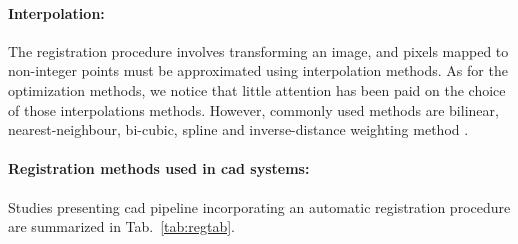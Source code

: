 \paragraph{Interpolation:} 
The registration procedure involves transforming an image, and pixels mapped to non-integer points must be approximated using interpolation methods.
As for the optimization methods, we notice that little attention has been paid on the choice of those interpolations methods.
However, commonly used methods are bilinear, nearest-neighbour, bi-cubic, spline and inverse-distance weighting method \cite{Mitra2012}.

\paragraph{Registration methods used in \ac{cad} systems:}
Studies presenting \ac{cad} pipeline incorporating an automatic registration procedure are summarized in Tab.~\ref{tab:regtab}.

